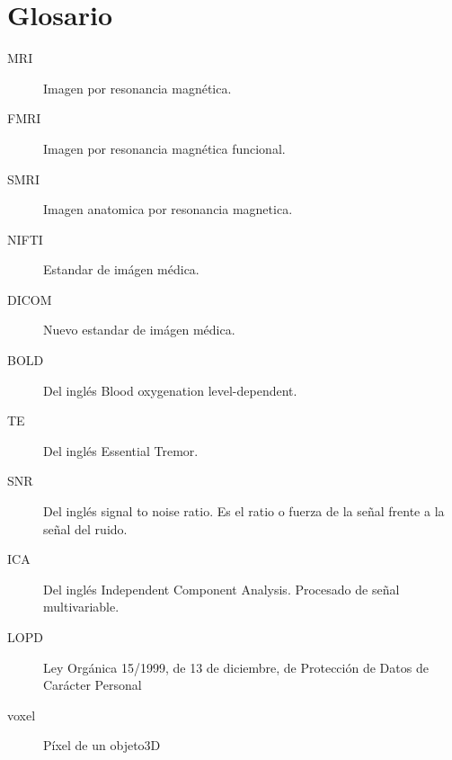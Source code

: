 
\chapter{Glosario}
\begin{description}
\item[MRI] Imagen por resonancia magnética. \label{glos:mri}
\item[FMRI] Imagen por resonancia magnética funcional. \label{glos:fmri}
\item[SMRI] Imagen anatomica por resonancia magnetica. \label{glos:smri}
\item[NIFTI] Estandar de imágen médica. \label{glos:nifti}
\item[DICOM] Nuevo estandar de imágen médica. \label{glos:dicom}
\item[BOLD] Del inglés Blood oxygenation level-dependent. \label{glos:bold}
\item[TE] Del inglés Essential Tremor. \label{glos:et}
\item[SNR] Del inglés signal to noise ratio. Es el ratio o fuerza de la señal frente a la señal del ruido. \label{glos:snr}
\item[ICA] Del inglés Independent Component Analysis. Procesado de señal multivariable. \label{glos:ica}
\item[LOPD] Ley Orgánica 15/1999, de 13 de diciembre, de Protección de Datos de Carácter Personal
 \label{glos:ica}
\item[voxel] Píxel de un objeto3D 
 \end{description}